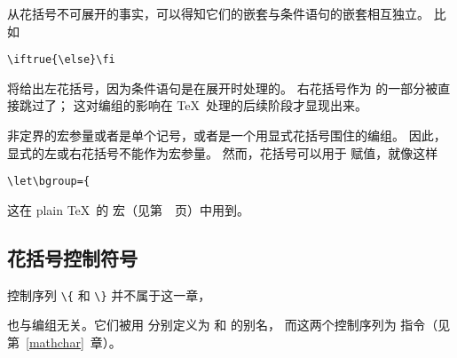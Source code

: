 \documentclass{book}
\begin{document}
从花括号不可展开的事实，可以得知它们的嵌套与条件语句的嵌套相互独立。
比如
\begin{verbatim}
\iftrue{\else}\fi
\end{verbatim}
将给出左花括号，因为条件语句是在展开时处理的。
右花括号作为  的一部分被直接跳过了；
这对编组的影响在 \TeX\ 处理的后续阶段才显现出来。

非定界的宏参量或者是单个记号，或者是一个用显式花括号围住的编组。
因此，显式的左或右花括号不能作为宏参量。
然而，花括号可以用于  赋值，就像这样
\begin{verbatim}
\let\bgroup={
\end{verbatim}
这在 plain \TeX\ 的  宏（见第~\pageref{footnote:ex}~页）中用到。

\subsection{花括号控制符号}

控制序列 \verb-\{- 和 \verb-\}- 并不属于这一章，
\cstoidx{}\par\cstoidx{}\par
也与编组无关。它们被用  分别定义为
 和  的别名，
而这两个控制序列为  指令（见第~\ref{mathchar}~章）。
\end{document}

